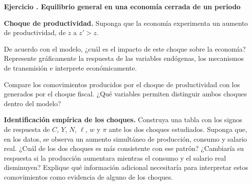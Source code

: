\documentclass[11pt]{article}
\let\enumerateoriginal\enumerate
\let\endenumerateoriginal\endenumerate
\renewenvironment{enumerate}{%
  \enumerateoriginal
  \setlength{\itemsep}{0.5em}%
  \setlength{\parsep}{0pt}%
  \setlength{\topsep}{0.4em}%
}{\endenumerateoriginal}
\newcounter{problema}
\newenvironment{problema}[1]{%
  \par
  \refstepcounter{problema}%
  \addvspace{0.9em}%
  \noindent\textbf{Ejercicio \theproblema. #1}
  \par\nobreak\smallskip
}{\par}
\begin{document}
\begin{problema}{Equilibrio general en una economía cerrada de un periodo}
\begin{enumerate}
  \item \textbf{Choque de productividad.} Suponga que la economía experimenta un aumento de productividad, de $z$ a $z'>z$.
  \begin{enumerate}
    \renewcommand{\labelenumii}{\textnormal{(\roman{enumii})}}
    \item De acuerdo con el modelo, ¿cuál es el impacto de este choque sobre la economía? Represente gráficamente la respuesta de las variables endógenas, los mecanismos de transmisión e interprete económicamente.
    \item Compare los comovimientos producidos por el choque de productividad con los generados por el choque fiscal. ¿Qué variables permiten distinguir ambos choques dentro del modelo?
  \end{enumerate}

  \item \textbf{Identificación empírica de los choques.}
  Construya una tabla con los signos de respuesta de $C$, $Y$, $N$, $\ell$, $w$ y $\pi$ ante los dos choques estudiados. Suponga que, en los datos, se observa un aumento simultáneo de producción, consumo y salario real. ¿Cuál de los dos choques es más consistente con ese patrón? ¿Cambiaría su
  respuesta si la producción aumentara mientras el consumo y el salario real disminuyen? Explique qué información adicional necesitaría para interpretar estos comovimientos como evidencia de alguno de los choques.
  \end{enumerate}

  \end{problema}
\end{document}

